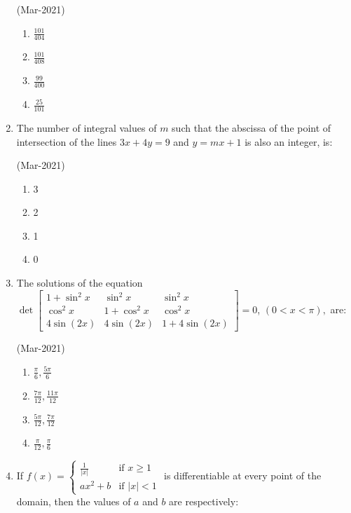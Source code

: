 \documentclass[journal,12pt,onecolumn]{IEEEtran}
\theoremstyle{remark}
\begin{document}
\begin{enumerate}
			\hfill{(Mar-2021)}
			\begin{multicols}{4}
                \begin{enumerate}
    \item $\frac{101}{404}$
    \item $\frac{101}{408}$
    \item $\frac{99}{400}$
    \item $\frac{25}{101}$
                \end{enumerate}
			\end{multicols}
	\item
		The number of integral values of $m$ such that the abscissa of the point of intersection of the lines $3x + 4y = 9$ and $y = mx + 1$ is also an integer, is:

			\hfill{(Mar-2021)}
			\begin{multicols}{4}
                \begin{enumerate}
    \item 3
    \item 2
    \item 1
    \item 0
                \end{enumerate}
			\end{multicols}
	\item
		The solutions of the equation $ \det\begin{bmatrix}
1 + \sin^2 x & \sin^2 x & \sin^2 x \\
\cos^2 x & 1 + \cos^2 x & \cos^2 x \\
4\sin(2x) & 4\sin(2x) & 1 + 4\sin(2x)
		\end{bmatrix} = 0 $, $(0 < x < \pi),$ are:

			\hfill{(Mar-2021)}
			\begin{multicols}{2}
		\begin{enumerate}
    \item $ \frac{\pi}{6}, \frac{5\pi}{6} $
    \item $ \frac{7\pi}{12}, \frac{11\pi}{12} $
    \item $ \frac{5\pi}{12}, \frac{7\pi}{12} $
    \item $ \frac{\pi}{12}, \frac{\pi}{6} $
                \end{enumerate}
			\end{multicols}
	\item
			If $f(x) = \begin{cases} \frac{1}{|x|} & \text{if } x \geq 1 \\ ax^2 + b & \text{if } |x| < 1 \end{cases}$ is differentiable at every point of the domain, then the values of $a$ and $b$ are respectively:


\end{enumerate}
\end{document}
